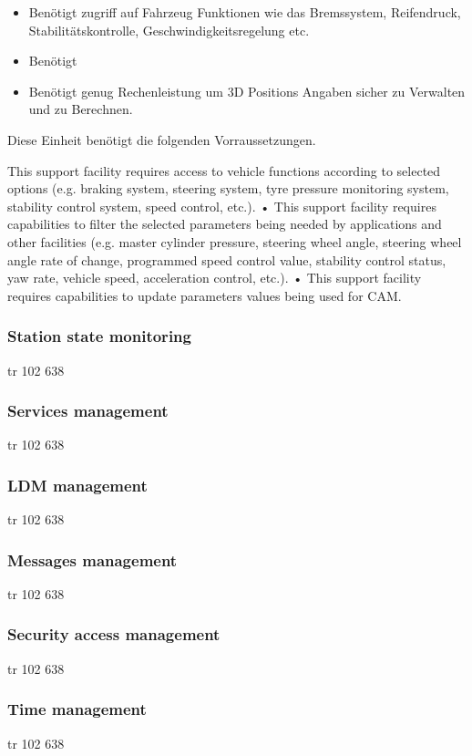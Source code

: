 \begin{itemize}
\item Benötigt zugriff auf Fahrzeug Funktionen wie das Bremssystem, Reifendruck, Stabilitätskontrolle, Geschwindigkeitsregelung etc.
\item Benötigt 
\item Benötigt genug Rechenleistung um 3D Positions Angaben sicher zu Verwalten und zu Berechnen.
\end{itemize}Diese Einheit benötigt die folgenden Vorraussetzungen.



This support facility requires access to vehicle functions according to selected options (e.g. braking system,
steering system, tyre pressure monitoring system, stability control system, speed control, etc.).
• This support facility requires capabilities to filter the selected parameters being needed by applications and
other facilities (e.g. master cylinder pressure, steering wheel angle, steering wheel angle rate of change,
programmed speed control value, stability control status, yaw rate, vehicle speed, acceleration control, etc.).
• This support facility requires capabilities to update parameters values being used for CAM. 


\subsubsection{Station state monitoring \label{facilitylayer_StationStateMonitoring}}
tr 102 638
\subsubsection{Services management \label{facilitylayer_ServicesManagement} }
tr 102 638
\subsubsection{LDM management \label{facilitylayer_LDMManagement}}
tr 102 638
\subsubsection{Messages management \label{facilitylayer_MessagesManagement}}
tr 102 638
\subsubsection{Security access management \label{facilitylayer_AccessManagement}}
tr 102 638
\subsubsection{Time management \label{facilitylayer_TimeManagement}}
tr 102 638
